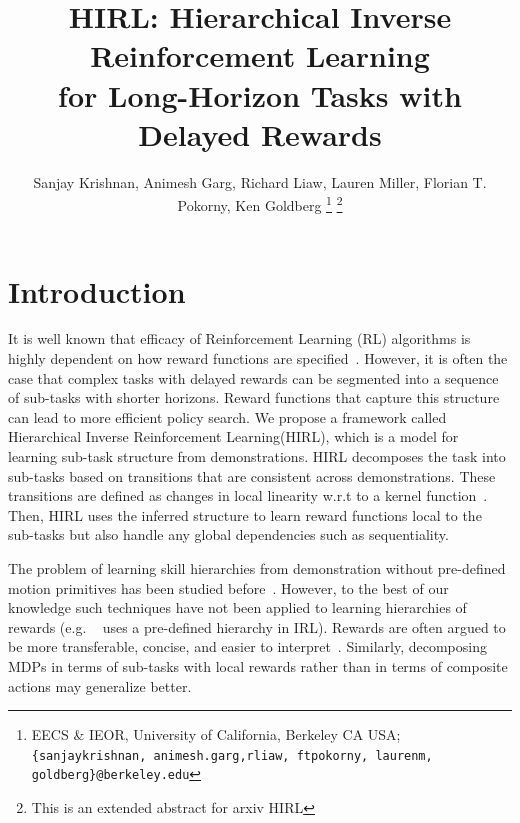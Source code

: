 \documentclass[letterpaper, 10 pt, conference]{ieeeconf}
\title{\LARGE \bf
HIRL: Hierarchical Inverse Reinforcement Learning \\
for Long-Horizon Tasks with Delayed Rewards
}
\author{%
Sanjay Krishnan, 
Animesh Garg, 
Richard Liaw,
Lauren Miller,
Florian T. Pokorny,
Ken Goldberg%
\thanks{EECS \& IEOR, University of California, Berkeley CA USA; \texttt{\{sanjaykrishnan, animesh.garg,rliaw, ftpokorny, laurenm, goldberg\}@berkeley.edu}}%
\thanks{This is an extended abstract for arxiv HIRL}%
}
\newcommand{\hirl}{HIRL\xspace}
\newcommand{\hirlfull}{Hierarchical Inverse Reinforcement Learning\xspace}
\begin{document}

\newtheorem{theorem}{Theorem}
\newtheorem{example}{Example}
\newtheorem{definition}{Definition}
\newtheorem{problem}{Problem}
\newtheorem{property}{Property}
\newtheorem{proposition}{Proposition}
\newtheorem{lemma}{Lemma}
\newtheorem{corollary}{Corollary}

\maketitle


\section{Introduction}
It is well known that efficacy of Reinforcement Learning (RL) algorithms is highly dependent on how reward functions are specified~\cite{DBLP:conf/icml/NgHR99}.
However, it is often the case that complex tasks with delayed rewards can be segmented into a sequence of sub-tasks with shorter horizons.
Reward functions that capture this structure can lead to more efficient policy search.
We propose a framework called \hirlfull (\hirl), which is a model for learning sub-task structure from demonstrations.
\hirl decomposes the task into sub-tasks based on transitions that are consistent across demonstrations. These transitions are defined as changes in local linearity w.r.t to a kernel function~\cite{krishnan2015tsc}. 
Then, \hirl uses the inferred structure to learn reward functions local to the sub-tasks but also handle any global dependencies such as sequentiality.


The problem of learning skill hierarchies from demonstration without pre-defined motion primitives has been studied before~\cite{niekum2012learning, calinon2014skills,konidaris2009efficient}.
However, to the best of our knowledge such techniques have not been applied to learning hierarchies of rewards (e.g. ~\cite{DBLP:conf/nips/KolterAN07} uses a pre-defined hierarchy in IRL). 
 Rewards are often argued to be more transferable, concise, and easier to interpret~\cite{DBLP:conf/icml/NgHR99}.
Similarly, decomposing MDPs in terms of sub-tasks with local rewards rather than in terms of composite actions may generalize better.
\end{document}
